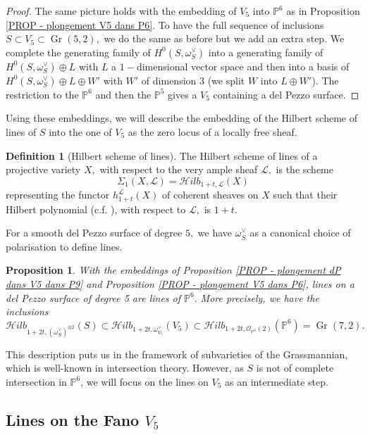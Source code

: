 \documentclass{amsart}
\theoremstyle{plain}%
\newtheorem{prop}[subsubsection]{Proposition}
\theoremstyle{remark}
\theoremstyle{definition}
\newtheorem{deff}[subsubsection]{Definition}
\newcommand{\cL}{\mathcal{L}}
\newcommand{\cO}{\mathcal{O}}
\newcommand{\eP}{\mathbb{P}}
\newcommand{\Grass}{\operatorname{Gr}}
\newcommand{\Hilbsch}[2][]{\mathcal{H}ilb_{#1}\left(#2\right)}
\newcommand{\Hdrtes}{\Sigma_1}
\begin{document}
\begin{proof}
The same picture holds with the embedding of $V_5$ into $\eP^6$ as in Proposition \ref{PROP - plongement V5 dans P6}. To have the full sequence of inclusions $S \subset V_5 \subset \Grass(5,2),$ we do the same as before but we add an extra step. We complete the generating family of $H^0(S,\omega_S^\vee)$ into a generating family of $H^0(S,\omega_S^\vee) \oplus L$ with $L$ a $1-$dimensional vector space and then into a basis of $H^0(S,\omega_S^\vee) \oplus L \oplus W'$ with $W'$ of dimension 3 (we split $W$ into $L\oplus W'$). The restriction to the $\eP^6$ and then the $\eP^5$ gives a $V_5$ containing a del Pezzo surface.
\end{proof}

Using these embeddings, we will describe the embedding of the Hilbert scheme of lines of $S$ into the one of $V_5$ as the zero locus of a locally free sheaf.

\begin{deff}[Hilbert scheme of lines]\label{DEF - schema Hilbert droites}
The Hilbert scheme of lines of a projective variety $X,$ with respect to the very ample sheaf $\cL,$ is the scheme
\[\Hdrtes (X,\cL) = \Hilbsch[1+t,\cL]{X}\]
representing the functor $h_{1+t}^{\cL}(X)$ of coherent sheaves on $X$ such that their Hilbert polynomial (c.f. \cite[Section 5.1.4]{FGA_explained}), with respect to $\cL,$ is $1+t.$
\end{deff}

For a smooth del Pezzo surface of degree $5,$ we have $\omega_S^\vee$ as a canonical choice of polarisation to define lines.
\begin{prop}\label{PROP - inclusions des schemes de Hilbert}
With the embeddings of Proposition \ref{PROP - plongement dP dans V5 dans P9} and Proposition \ref{PROP - plongement V5 dans P6}, lines on a del Pezzo surface of degree 5 are lines of $\eP^6.$ More precisely, we have the inclusions
\[ \Hilbsch[1+2t,(\omega_S^\vee)^{\otimes 2}]{S} \subset \Hilbsch[1+2t,\omega_{V_5}^\vee]{V_5} \subset \Hilbsch[1+2t,\cO_{\eP^6}(2)]{\eP^6} = \Grass(7,2).\]
\end{prop}

This description puts us in the framework of subvarieties of the Grassmannian, which is well-known in intersection theory. However, as $S$ is not of complete intersection in $\eP^6$, we will focus on the lines on $V_5$ as an intermediate step.


\subsection{Lines on the Fano $V_5$}\label{SSEC - droites de la Fano quintique}
\end{document}
